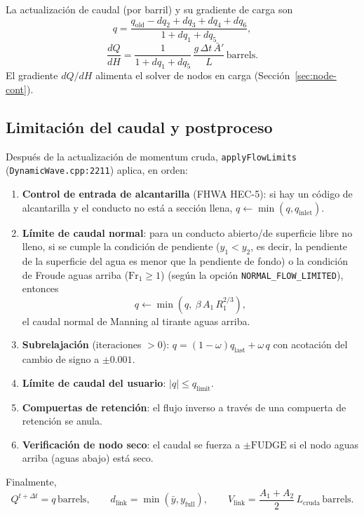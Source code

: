 \documentclass[11pt,a4paper]{article}
\begin{document}
La actualización de caudal (por barril) y su gradiente de carga son
\begin{equation}
  q = \frac{q_{\mathrm{old}} - dq_2 + dq_3 + dq_4 + dq_6}
           {1 + dq_1 + dq_5},
  \label{eq:q-update}
\end{equation}
\begin{equation}
  \frac{dQ}{dH} = \frac{1}{1 + dq_1 + dq_5}\,
  \frac{g\,\Delta t\, \bar A'}{L}\,\mathrm{barrels}.
  \label{eq:dqdh}
\end{equation}
El gradiente $dQ/dH$ alimenta el solver de nodos en carga
(Sección~\ref{sec:node-cont}).

\subsection{Limitación del caudal y postproceso}

Después de la actualización de momentum cruda, \texttt{applyFlowLimits}
(\texttt{DynamicWave.cpp:2211}) aplica, en orden:
\begin{enumerate}[nosep]
  \item \textbf{Control de entrada de alcantarilla} (FHWA HEC-5): si hay un
        código de alcantarilla y el conducto no está a sección llena,
        $q \leftarrow \min(q, q_{\mathrm{inlet}})$.
  \item \textbf{Límite de caudal normal}: para un conducto abierto/de
        superficie libre no lleno, si se cumple la condición de pendiente
        ($y_1 < y_2$, es decir, la pendiente de la superficie del agua es menor
        que la pendiente de fondo) o la condición de Froude aguas arriba
        ($\mathrm{Fr}_1 \ge 1$) (según la opción \texttt{NORMAL\_FLOW\_LIMITED}),
        entonces
        \begin{equation}
          q \leftarrow \min\!\left(q,\ \beta\,A_1\,R_1^{2/3}\right),
        \end{equation}
        el caudal normal de Manning al tirante aguas arriba.
  \item \textbf{Subrelajación} (iteraciones $> 0$):
        $q = (1-\omega)q_{\mathrm{last}} + \omega\,q$ con acotación del cambio
        de signo a $\pm 0.001$.
  \item \textbf{Límite de caudal del usuario}: $\lvert q \rvert \le
        q_{\mathrm{limit}}$.
  \item \textbf{Compuertas de retención}: el flujo inverso a través de una
        compuerta de retención se anula.
  \item \textbf{Verificación de nodo seco}: el caudal se fuerza a
        $\pm \mathrm{FUDGE}$ si el nodo aguas arriba (aguas abajo) está seco.
\end{enumerate}
Finalmente,
\begin{equation}
  Q^{t+\Delta t} = q\,\mathrm{barrels}, \qquad
  d_{\mathrm{link}} = \min(\bar y, y_{\mathrm{full}}), \qquad
  V_{\mathrm{link}} = \frac{A_1 + A_2}{2}\,L_{\mathrm{cruda}}\,\mathrm{barrels}.
\end{equation}
\end{document}

